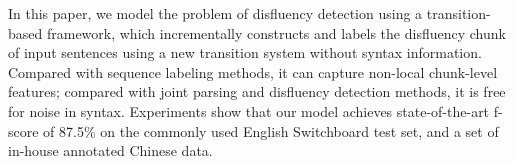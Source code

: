 In this paper, we model the problem of disfluency detection using a transition-based framework, which incrementally constructs and labels the disfluency chunk of input sentences using a new transition system without syntax information. Compared with sequence labeling methods, it can capture non-local chunk-level features; compared with joint parsing and disfluency detection methods, it is free for noise in syntax. Experiments show that our model achieves state-of-the-art f-score of 87.5\% on the commonly used English Switchboard test set, and a set of  in-house annotated Chinese data.
